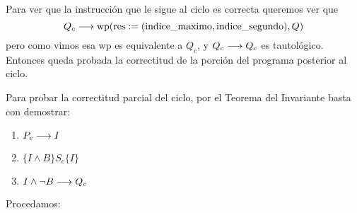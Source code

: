 \documentclass[10pt,a4paper]{article}
\newcommand{\var}{\text}
\renewcommand{\wp}{\text{wp}}
\begin{document}
Para ver que la instrucción que le sigue al ciclo es correcta queremos ver que
$$Q_c \implica \wp(\var{res} := (\var{indice\_maximo}, \var{indice\_segundo}), Q)$$
pero como vimos esa wp es equivalente a $Q_c$, y $Q_c \longrightarrow Q_c$ es tautológico. Entonces queda probada la correctitud de la porción del programa posterior al ciclo.

Para probar la correctitud parcial del ciclo, por el Teorema del Invariante basta con demostrar:
\begin{enumerate}
\itemsep 0em
    \item $P_c\longrightarrow I$ 
    \item $\{I\land B\}S_c\{I\}$
    \item $I\land \neg B\longrightarrow Q_c$
\end{enumerate}

Procedamos:
\end{document}
